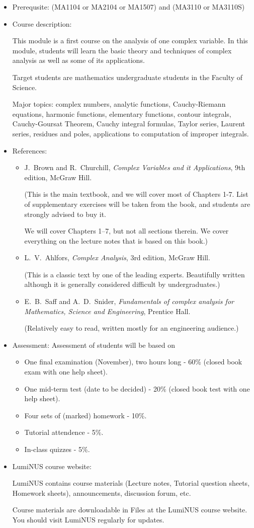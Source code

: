 \documentclass[a4paper]{article}
\begin{document}
\begin{itemize}
\item Prerequsite: (MA1104 or MA2104 or MA1507) and (MA3110 or MA3110S)
  
\item Course description:
  
  This module is a first course on the analysis of one complex variable. In this module, students will learn the basic theory and techniques of complex analysis as well as some of its applications.
  
  Target students are mathematics undergraduate students in the Faculty of Science.

  Major topics: complex numbers, analytic functions, Cauchy-Riemann equations, harmonic functions, elementary functions, contour integrals, Cauchy-Goursat Theorem, Cauchy integral formulas, Taylor series, Laurent series, residues and poles, applications to computation of improper
integrals.
  
\item References:
  \begin{itemize}
  \item 
    J.~Brown and R.~Churchill, \emph{Complex Variables and it Applications}, 9th edition, McGraw Hill.
    
    (This is the main textbook, and we will cover most of Chapters 1-7.  List of supplementary exercises will be taken from the book, and students are strongly advised to buy it.

    We will cover Chapters 1--7, but not all sections therein. We cover everything on the lecture notes that is based on this book.)
  \item 
    L.~V.~Ahlfors, \emph{Complex Analysis}, 3rd edition, McGraw Hill.

    (This is a classic text by one of the leading experts. Beautifully written although it is generally considered difficult by undergraduates.)
  \item
    E.~B.~Saff and A.~D.~Snider, \emph{Fundamentals of complex analysis for Mathematics, Science and Engineering}, Prentice Hall.
    
    (Relatively easy to read, written mostly for an engineering audience.)
  \end{itemize}
\item Assessment:
  Assessment of students will be based on
  \begin{itemize}
  \item
    One final examination (November), two hours long - 60\% (closed book exam with one help sheet).
  \item 
    One mid-term test (date to be decided) - 20\% (closed book test with one help sheet).
  \item 
    Four sets of (marked) homework - 10\%.
  \item 
    Tutorial attendence - 5\%.
  \item
    In-class quizzes - 5\%.
  \end{itemize}
\item
  LumiNUS course website:

  LumiNUS contains course materials (Lecture notes, Tutorial question sheets, Homework sheets), announcements, discussion forum, etc.

  Course materials are downloadable in Files at the LumiNUS course website. You should visit LumiNUS regularly for updates.
\end{itemize}
\end{document}
